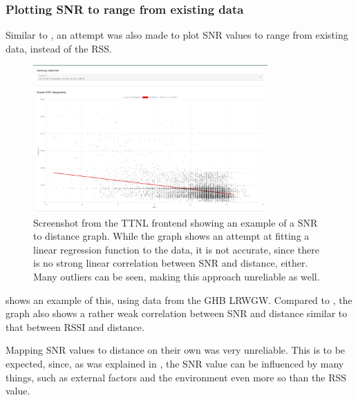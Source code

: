 \subsubsection{Plotting \acs{SNR} to range from existing data}\label{sec:plotting-snr-to-range-from-existing-data}

Similar to , an attempt was also made to plot \ac{SNR} values to range from existing data, instead of the \ac{RSS}.

\begin{figure}[htbp]
    \centering
    \includegraphics[width=0.8\textwidth]{pictures/ttn-locator/frontend/data/gateway_ghb_snr_range_graph.jpg}
    \caption[Screenshot from the \acl{TTNL} frontend showing an example of a \acl{SNR} to distance graph]{
        Screenshot from the \ac{TTNL} frontend showing an example of a \acf{SNR} to distance graph.
        While the graph shows an attempt at fitting a linear regression function to the data, it is not accurate, since there is no strong linear correlation between \ac{SNR} and distance, either.
        Many outliers can be seen, making this approach unreliable as well.
    }\label{fig:snr-range-graph-example}
\end{figure}

 shows an example of this, using data from the \ac{GHB} \acl{LRWGW}.
Compared to , the graph also shows a rather weak correlation between \ac{SNR} and distance similar to that between \ac{RSSI} and distance.

Mapping \ac{SNR} values to distance on their own was very unreliable.
This is to be expected, since, as was explained in , the \ac{SNR} value can be influenced by many things, such as external factors and the environment even more so than the \ac{RSS} value.

